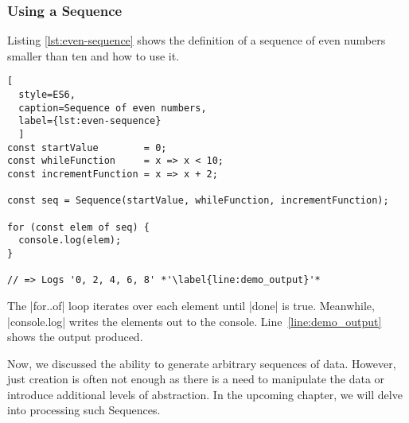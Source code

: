 \subsubsection{Using a Sequence}
\label{subsub:Using a Sequence}
Listing \ref{lst:even-sequence} shows the definition of a sequence of even 
numbers smaller than ten and how to use it. 
\begin{lstlisting}[
  style=ES6, 
  caption=Sequence of even numbers,
  label={lst:even-sequence}
  ]
const startValue        = 0;
const whileFunction     = x => x < 10;
const incrementFunction = x => x + 2;

const seq = Sequence(startValue, whileFunction, incrementFunction);

for (const elem of seq) {
  console.log(elem);
}

// => Logs '0, 2, 4, 6, 8' *'\label{line:demo_output}'*
\end{lstlisting}

The |for..of| loop iterates over each
element until |done| is true. Meanwhile, |console.log| writes the elements out 
to the console. Line~\ref{line:demo_output} shows the output produced.
\newline

Now, we discussed the ability to generate arbitrary sequences of data. However, 
just creation is often not enough as there is a need to manipulate the data or 
introduce additional levels of abstraction. In the upcoming chapter, we will 
delve into processing such Sequences.
